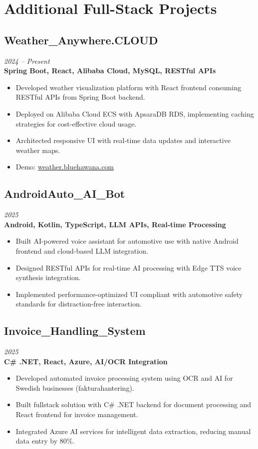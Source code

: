 \documentclass[10pt,a4paper]{article}
\begin{document}
\section*{Additional Full-Stack Projects}

\subsection*{Weather\_Anywhere.CLOUD}
\textit{2024 -- Present} \\
\textbf{Spring Boot, React, Alibaba Cloud, MySQL, RESTful APIs}
\begin{itemize}[noitemsep]
\item Developed weather visualization platform with React frontend consuming RESTful APIs from Spring Boot backend.
\item Deployed on Alibaba Cloud ECS with ApsaraDB RDS, implementing caching strategies for cost-effective cloud usage.
\item Architected responsive UI with real-time data updates and interactive weather maps.
\item Demo: \href{https://weather.bluehawana.com}{weather.bluehawana.com}
\end{itemize}

\subsection*{AndroidAuto\_AI\_Bot}
\textit{2025} \\
\textbf{Android, Kotlin, TypeScript, LLM APIs, Real-time Processing}
\begin{itemize}[noitemsep]
\item Built AI-powered voice assistant for automotive use with native Android frontend and cloud-based LLM integration.
\item Designed RESTful APIs for real-time AI processing with Edge TTS voice synthesis integration.
\item Implemented performance-optimized UI compliant with automotive safety standards for distraction-free interaction.
\end{itemize}

\subsection*{Invoice\_Handling\_System}
\textit{2025} \\
\textbf{C\# .NET, React, Azure, AI/OCR Integration}
\begin{itemize}[noitemsep]
\item Developed automated invoice processing system using OCR and AI for Swedish businesses (fakturahantering).
\item Built fullstack solution with C\# .NET backend for document processing and React frontend for invoice management.
\item Integrated Azure AI services for intelligent data extraction, reducing manual data entry by 80\%.
\end{itemize}
\end{document}
